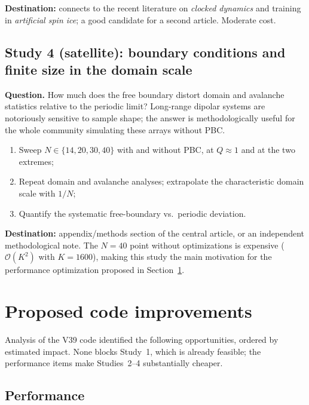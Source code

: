 \documentclass[11pt,a4paper]{article}
\begin{document}
\textbf{Destination:} connects to the recent literature on \emph{clocked dynamics} and training in \emph{artificial spin ice}; a good candidate for a second article. Moderate cost.

\subsection{Study 4 (satellite): boundary conditions and finite size in the domain scale}

\textbf{Question.} How much does the free boundary distort domain and avalanche statistics relative to the periodic limit? Long-range dipolar systems are notoriously sensitive to sample shape; the answer is methodologically useful for the whole community simulating these arrays without PBC.

\begin{enumerate}
\item Sweep $N \in \{14, 20, 30, 40\}$ with and without PBC, at $Q \approx 1$ and at the two extremes;
\item Repeat domain and avalanche analyses; extrapolate the characteristic domain scale with $1/N$;
\item Quantify the systematic free-boundary vs.\ periodic deviation.
\end{enumerate}

\textbf{Destination:} appendix/methods section of the central article, or an independent methodological note. The $N = 40$ point without optimizations is expensive ($\mathcal{O}(K^2)$ with $K = 1600$), making this study the main motivation for the performance optimization proposed in Section~\ref{sec:improvements}.

\section{Proposed code improvements}
\label{sec:improvements}

Analysis of the V39 code identified the following opportunities, ordered by estimated impact. None blocks Study~1, which is already feasible; the performance items make Studies~2--4 substantially cheaper.

\subsection{Performance}
\end{document}
